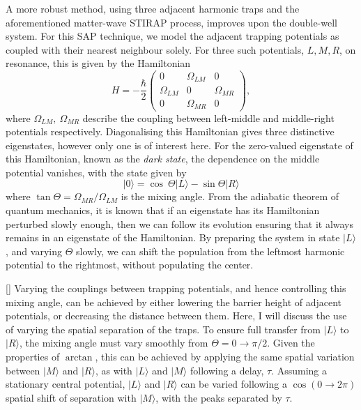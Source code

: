 A more robust method, using three adjacent harmonic traps and the aforementioned matter-wave STIRAP process, improves upon the double-well system. For this SAP technique, we model the adjacent trapping potentials as coupled with their nearest neighbour solely. For three such potentials, $L,M,R$, on resonance, this is given by the Hamiltonian
\begin{equation}\label{eqn:sap_ham}
    H = -\frac{\hbar}{2}
    \begin{pmatrix}
        0 & \Omega_{LM} & 0 \\
        \Omega_{LM} & 0 & \Omega_{MR} \\
        0 & \Omega_{MR} & 0
    \end{pmatrix},
\end{equation}
where $\Omega_{LM},~\Omega_{MR}$ describe the coupling between left-middle and middle-right potentials respectively. Diagonalising this Hamiltonian gives three distinctive eigenstates, however only one is of interest here. For the zero-valued eigenstate of this Hamiltonian, known as the \textit{dark state}, the dependence on the middle potential vanishes, with the state given by
\begin{equation}
 | 0 \rangle = \cos\ \Theta| L \rangle - \sin \Theta | R \rangle
\end{equation}
where $\tan \Theta=\Omega_{MR}/\Omega_{LM}$ is the mixing angle. From the adiabatic theorem of quantum mechanics, it is known that if an eigenstate has its Hamiltonian perturbed slowly enough, then we can follow its evolution ensuring that it always remains in an eigenstate of the Hamiltonian. By preparing the system in state $| L \rangle$, and varying $\Theta$ slowly, we can shift the population from the leftmost harmonic potential to the rightmost, without populating the center.

 []
Varying the couplings between trapping potentials, and hence controlling this mixing angle, can be achieved by either lowering the barrier height of adjacent potentials, or decreasing the distance between them. Here, I will discuss the use of varying the spatial separation of the traps. To ensure full transfer from
$|L \rangle$ to $| R \rangle$, the mixing angle must vary smoothly from $\Theta = 0 \rightarrow \pi/2$. Given the properties of $\arctan$, this can be achieved by applying the same spatial variation between $|M \rangle$ and $| R\rangle$, as with $|L \rangle$ and $| M\rangle$ following a delay, $\tau$. Assuming a stationary central potential, $| L \rangle$ and $| R\rangle$ can be varied following a $\cos(0 \rightarrow 2\pi)$ spatial shift of separation with $| M \rangle$, with the peaks separated by $\tau$.


